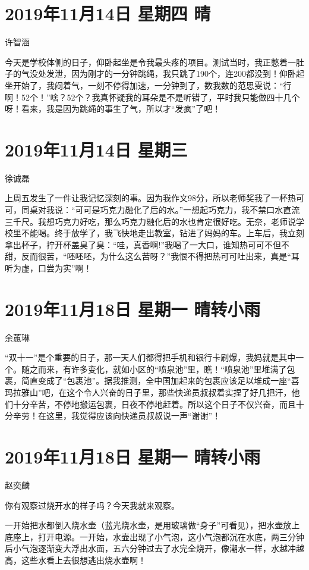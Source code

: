 \section{2019年11月14日 星期四 晴}

许智涵

今天是学校体侧的日子，仰卧起坐是令我最头疼的项目。测试当时，我正憋着一肚子的气没处发泄，因为刚才的一分钟跳绳，我只跳了190个，连200都没到！仰卧起坐开始了，我闷着气，一刻不停得加速，一分钟到了，数我数的范思雯说：“行啊！52个！”啥？52个？我真怀疑我的耳朵是不是听错了，平时我只能做四十几个呀！看来，我是因为跳绳的事生了气，所以才“发疯”了吧！

\section{2019年11月14日 星期三}

徐诚磊

上周五发生了一件让我记忆深刻的事。因为我作文98分，所以老师奖我了一杯热可可，同桌对我说：“可可是巧克力融化了后的水。”一想起巧克力，我不禁口水直流三千尺。我想巧克力好吃，那么巧克力融化后的水也肯定很好吃。无奈，老师说学校里不能喝。终于放学了，我飞快地走出教室，钻进了妈妈的车。上车后，我立刻拿出杯子，拧开杯盖臭了臭：“哇，真香啊!”我喝了一大口，谁知热可可不但不甜，反而很苦，“呸呸呸，为什么这么苦呀？”我恨不得把热可可吐出来，真是“耳听为虚，口尝为实”啊！

\section{2019年11月18日 星期一 晴转小雨}

余蕙琳

“双十一”是个重要的日子，那一天人们都得把手机和银行卡刷爆，我妈就是其中一个。随之而来，有许多变化，就如小区的“喷泉池”里，瞧！“喷泉池”里堆满了包裹，简直变成了“包裹池”。据我推测，全中国加起来的包裹应该足以堆成一座“喜玛拉雅山”吧，在这个令人兴奋的日子里，那些快递员叔叔着实捏了好几把汗，他们十分辛苦，不停地搬运包裹，日夜不停地赶着。所以这个日子不仅兴奋，而且十分辛劳！在这里，我觉得应该向快递员叔叔说一声“谢谢”！

\section{2019年11月18日 星期一 晴转小雨}

赵奕麟

你有观察过烧开水的样子吗？今天我就来观察。

一开始把水都倒入烧水壶（蓝光烧水壶，是用玻璃做“身子”可看见），把水壶放上底座上，打开电源。一开始，水壶出现了小气泡，这小气泡都沉在水底，两三分钟后小气泡逐渐变大浮出水面，五六分钟过去了水完全烧开，像潮水一样，水越冲越高，这些水看上去很想逃出烧水壶啊！

